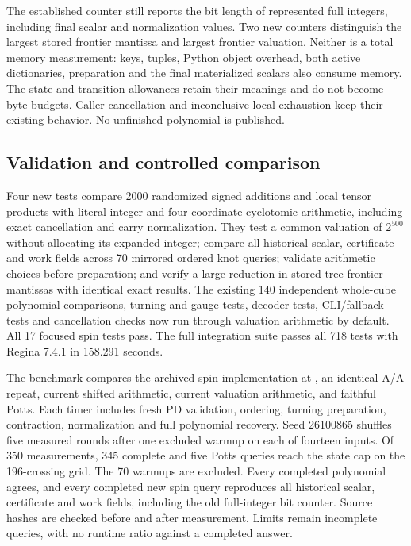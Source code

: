 The established  counter still reports the bit
length of represented full integers, including final scalar and normalization
values. Two new counters distinguish the largest stored frontier mantissa
and largest frontier valuation. Neither is a total memory measurement:
keys, tuples, Python object overhead, both active dictionaries, preparation
and the final materialized scalars also consume memory. The state and
transition allowances retain their meanings and do not become byte budgets.
Caller cancellation and inconclusive local exhaustion keep their existing
behavior. No unfinished polynomial is published.

\subsection{Validation and controlled comparison}
Four new tests compare 2000 randomized signed additions and local tensor
products with literal integer and four-coordinate cyclotomic arithmetic,
including exact cancellation and carry normalization. They test a common
valuation of $2^{500}$ without allocating its expanded integer; compare all
historical scalar, certificate and work fields across 70 mirrored ordered
knot queries; validate arithmetic choices before preparation; and verify a
large reduction in stored tree-frontier mantissas with identical exact results.
The existing 140 independent whole-cube polynomial comparisons, turning and
gauge tests, decoder tests, CLI/fallback tests and cancellation checks now run
through valuation arithmetic by default. All 17 focused spin tests pass.
The full integration suite passes all 718 tests with Regina 7.4.1 in
158.291 seconds.



The benchmark compares the archived spin implementation at ,
an identical A/A repeat, current shifted arithmetic, current valuation
arithmetic, and faithful Potts. Each timer includes fresh PD validation,
ordering, turning preparation, contraction, normalization and full polynomial
recovery. Seed 26100865 shuffles five measured rounds after one excluded
warmup on each of fourteen inputs. Of 350 measurements, 345 complete and
five Potts queries reach the state cap on the 196-crossing grid. The 70
warmups are excluded. Every completed polynomial agrees, and every completed
new spin query reproduces all historical scalar, certificate and work fields,
including the old full-integer bit counter. Source hashes are checked before
and after measurement. Limits remain incomplete queries, with no runtime ratio
against a completed answer.

